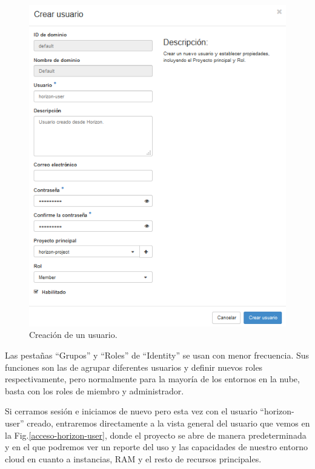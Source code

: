 \begin{figure}
    \centering
    \includegraphics[width=1\textwidth]{imagenes/capitulo6/crear-usuario.PNG}
    \caption{Creación de un usuario.}
	\vspace{0.3cm}
    \label{crear-usuario}
\end{figure}

Las pestañas “Grupos” y “Roles” de “Identity” se usan con menor frecuencia. Sus funciones son las de  agrupar diferentes usuarios y definir nuevos roles respectivamente, pero normalmente para la mayoría de los entornos en la nube, basta con los roles de miembro y administrador.


Si cerramos sesión e iniciamos de nuevo pero esta vez con el usuario “horizon-user” creado, entraremos directamente a la vista general del usuario que vemos en la Fig.\ref{acceso-horizon-user}, donde el proyecto se abre de manera predeterminada y en el que podremos ver un reporte del uso y las capacidades de nuestro entorno cloud en cuanto a instancias, RAM y el resto de recursos principales.

